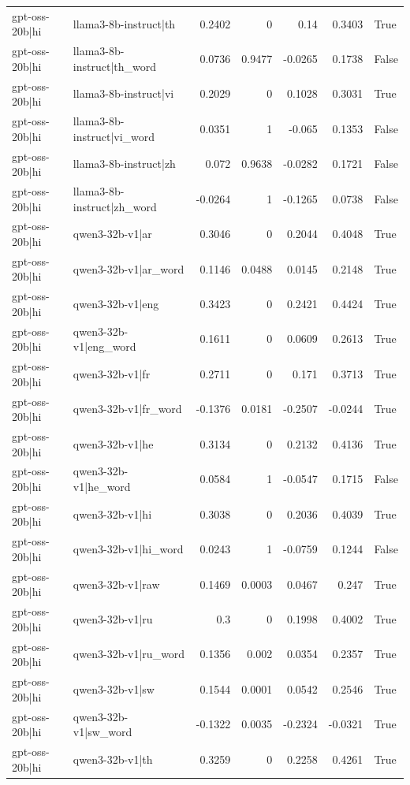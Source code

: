 \begin{table}
\begin{tabular}{l l r r r r l}
gpt-oss-20b|hi & llama3-8b-instruct|th & 0.2402 & 0 & 0.14 & 0.3403 & True \\
gpt-oss-20b|hi & llama3-8b-instruct|th_word & 0.0736 & 0.9477 & -0.0265 & 0.1738 & False \\
gpt-oss-20b|hi & llama3-8b-instruct|vi & 0.2029 & 0 & 0.1028 & 0.3031 & True \\
gpt-oss-20b|hi & llama3-8b-instruct|vi_word & 0.0351 & 1 & -0.065 & 0.1353 & False \\
gpt-oss-20b|hi & llama3-8b-instruct|zh & 0.072 & 0.9638 & -0.0282 & 0.1721 & False \\
gpt-oss-20b|hi & llama3-8b-instruct|zh_word & -0.0264 & 1 & -0.1265 & 0.0738 & False \\
gpt-oss-20b|hi & qwen3-32b-v1|ar & 0.3046 & 0 & 0.2044 & 0.4048 & True \\
gpt-oss-20b|hi & qwen3-32b-v1|ar_word & 0.1146 & 0.0488 & 0.0145 & 0.2148 & True \\
gpt-oss-20b|hi & qwen3-32b-v1|eng & 0.3423 & 0 & 0.2421 & 0.4424 & True \\
gpt-oss-20b|hi & qwen3-32b-v1|eng_word & 0.1611 & 0 & 0.0609 & 0.2613 & True \\
gpt-oss-20b|hi & qwen3-32b-v1|fr & 0.2711 & 0 & 0.171 & 0.3713 & True \\
gpt-oss-20b|hi & qwen3-32b-v1|fr_word & -0.1376 & 0.0181 & -0.2507 & -0.0244 & True \\
gpt-oss-20b|hi & qwen3-32b-v1|he & 0.3134 & 0 & 0.2132 & 0.4136 & True \\
gpt-oss-20b|hi & qwen3-32b-v1|he_word & 0.0584 & 1 & -0.0547 & 0.1715 & False \\
gpt-oss-20b|hi & qwen3-32b-v1|hi & 0.3038 & 0 & 0.2036 & 0.4039 & True \\
gpt-oss-20b|hi & qwen3-32b-v1|hi_word & 0.0243 & 1 & -0.0759 & 0.1244 & False \\
gpt-oss-20b|hi & qwen3-32b-v1|raw & 0.1469 & 0.0003 & 0.0467 & 0.247 & True \\
gpt-oss-20b|hi & qwen3-32b-v1|ru & 0.3 & 0 & 0.1998 & 0.4002 & True \\
gpt-oss-20b|hi & qwen3-32b-v1|ru_word & 0.1356 & 0.002 & 0.0354 & 0.2357 & True \\
gpt-oss-20b|hi & qwen3-32b-v1|sw & 0.1544 & 0.0001 & 0.0542 & 0.2546 & True \\
gpt-oss-20b|hi & qwen3-32b-v1|sw_word & -0.1322 & 0.0035 & -0.2324 & -0.0321 & True \\
gpt-oss-20b|hi & qwen3-32b-v1|th & 0.3259 & 0 & 0.2258 & 0.4261 & True \\

\end{tabular}
\end{table}
